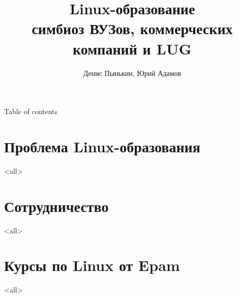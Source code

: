 
\graphicspath{{../lvee2013-winter/clipart/}}
\title{Linux-образование \\ симбиоз ВУЗов, коммерческих компаний и LUG}
\author{Денис Пынькин, Юрий Адамов}



\begin{frame}
	\titlepage
\end{frame}

\begin{frame}{Table of contents}
	\tableofcontents
\end{frame}


\section[Проблема]{Проблема Linux-образования}
\mode<all>{}
\section{Сотрудничество}
\mode<all>{}
\section[Epam]{Курсы по Linux от Epam}
\mode<all>{}
